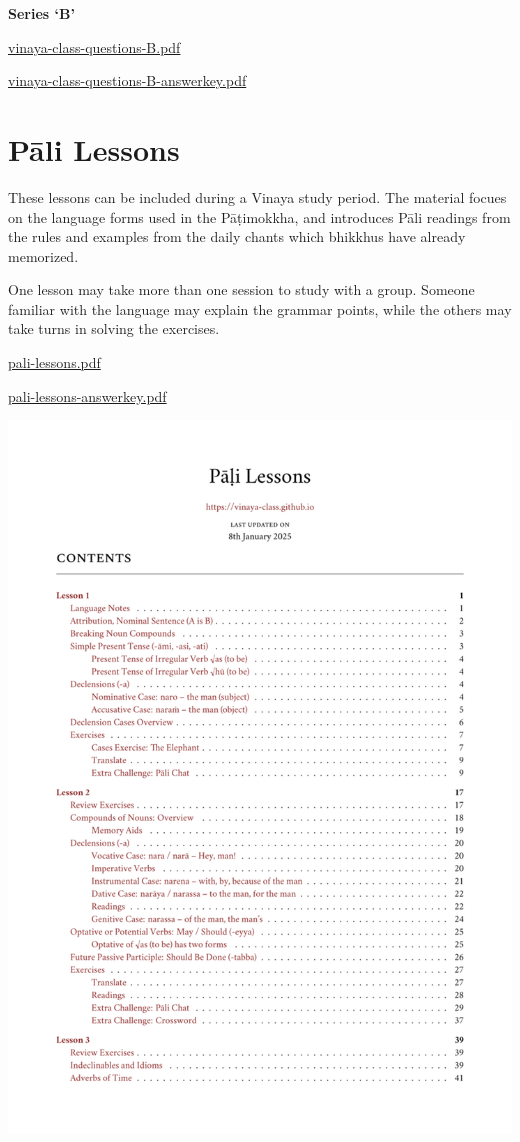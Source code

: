 \textbf{Series `B'}

\href{./includes/docs/vinaya-class-questions-B.pdf}{vinaya-class-questions-B.pdf}

\href{./includes/docs/vinaya-class-questions-B-answerkey.pdf}{vinaya-class-questions-B-answerkey.pdf}

\section{Pāli Lessons}

These lessons can be included during a Vinaya study period. The material
focues on the language forms used in the Pāṭimokkha, and introduces Pāli
readings from the rules and examples from the daily chants which
bhikkhus have already memorized.

One lesson may take more than one session to study with a group. Someone
familiar with the language may explain the grammar points, while the
others may take turns in solving the exercises.

\href{./includes/docs/pali-lessons.pdf}{pali-lessons.pdf}

\href{./includes/docs/pali-lessons-answerkey.pdf}{pali-lessons-answerkey.pdf}

\href{./includes/docs/pali-lessons.pdf}{\includegraphics{./includes/docs/pali-lessons-thumb.png}}

